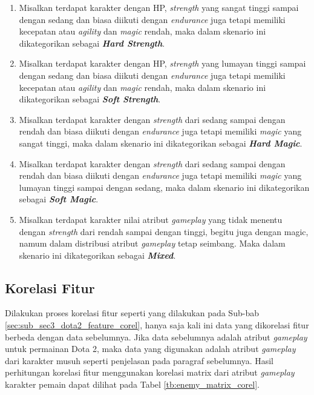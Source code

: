 \begin{enumerate}[label=\arabic*).]
	\item Misalkan terdapat karakter dengan HP, \textit{strength} yang sangat tinggi sampai dengan sedang dan biasa diikuti dengan \textit{endurance} juga tetapi memiliki kecepatan atau \textit{agility} dan \textit{magic} rendah, maka dalam skenario ini dikategorikan sebagai \textbf{\textit{Hard Strength}}. 
	
	\item Misalkan terdapat karakter dengan HP, \textit{strength} yang lumayan tinggi sampai dengan sedang dan biasa diikuti dengan \textit{endurance} juga tetapi memiliki kecepatan atau \textit{agility} dan \textit{magic} rendah, maka dalam skenario ini dikategorikan sebagai \textbf{\textit{Soft Strength}}.
	
	\item Misalkan terdapat karakter dengan \textit{strength} dari sedang sampai dengan rendah dan biasa diikuti dengan \textit{endurance} juga tetapi memiliki \textit{magic} yang sangat tinggi, maka dalam skenario ini dikategorikan sebagai \textbf{\textit{Hard Magic}}.
	
	\item Misalkan terdapat karakter dengan \textit{strength} dari sedang sampai dengan rendah dan biasa diikuti dengan \textit{endurance} juga tetapi memiliki \textit{magic} yang lumayan tinggi sampai dengan sedang, maka dalam skenario ini dikategorikan sebagai \textbf{\textit{Soft Magic}}.
	
	\item Misalkan terdapat karakter nilai atribut \textit{gameplay} yang tidak menentu dengan \textit{strength} dari rendah sampai dengan tinggi, begitu juga dengan magic, namum dalam distribusi atribut \textit{gameplay} tetap seimbang. Maka dalam skenario ini dikategorikan sebagai \textbf{\textit{Mixed}}.
\end{enumerate}

\subsection{Korelasi Fitur}
\label{sec:sub_sec3_enemy_feature_corel}
\vspace{1ex}

Dilakukan proses korelasi fitur seperti yang dilakukan pada Sub-bab \ref{sec:sub_sec3_dota2_feature_corel}, hanya saja kali ini data yang dikorelasi fitur berbeda dengan data sebelumnya. Jika data sebelumnya adalah atribut \textit{gameplay} untuk permainan Dota 2, maka data yang digunakan adalah atribut \textit{gameplay} dari karakter musuh seperti penjelasan pada paragraf sebelumnya. Hasil perhitungan korelasi fitur menggunakan korelasi matrix dari atribut \textit{gameplay} karakter pemain dapat dilihat pada Tabel \ref{tb:enemy_matrix_corel}. 
\vspace{-1ex}

